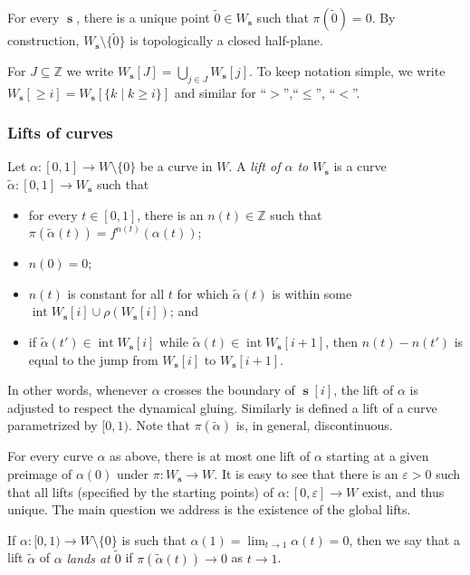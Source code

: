 \documentclass[]{amsart}
\newcommand\intr{\operatorname{int}}
\newcommand\seq{{\operatorname{\mathbf s}}}
\newcommand{\Z}{\mathbb{Z}}
\theoremstyle{remark}
\numberwithin{equation}{section}
\theoremstyle{definition}
\begin{document}
For every $\seq$, there is a unique point $\widetilde 0\in W_\seq$ such that $\pi(\widetilde 0)=0$. By construction, $W_\seq\setminus \{\widetilde 0\}$ is topologically a closed half-plane.
 
For $J\subseteq \Z$ we write $\displaystyle W_\seq[J]= \bigcup _{j\in J} W_\seq[j]$. To keep notation simple, we write $W_\seq[\ge i] =W_\seq[\{k\mid k\ge i\}]$ and similar for ``$>$'',``$\le$'', ``$<$''.




\subsubsection{Lifts of curves}
\label{sss:lifts of curves}
Let $\alpha\colon [0,1]\to W\setminus \{0\}$ be a curve in $W$. A \emph{lift of $\alpha$ to $W_{\seq}$} is a curve $\widetilde \alpha\colon [0,1]\to W_{\seq}$ such that
\begin{itemize}
\item for every $t\in[0,1]$, there is an $n(t)\in \Z$ such that $\pi(\widetilde \alpha(t))=f^ {n(t)}(\alpha(t))$;
\item $n(0)=0$;  
\item $n(t)$ is constant for all $t$ for which $\widetilde \alpha(t)$ is within some $\intr W_{\seq}[i] \cup \rho(W_\seq[i])$; and 
\item if $\widetilde \alpha(t')\in \intr W_{\seq}[i]$ while $\widetilde\alpha(t)\in \intr W_{\seq}[i+1]$, then $n(t)-n(t')$ is equal to the jump from $W_{\seq}[i]$ to $W_{\seq}[i+1]$.
\end{itemize}
In other words, whenever $\alpha$ crosses the boundary of $\seq[i]$, the lift of $\alpha$ is adjusted to respect the dynamical gluing. Similarly is defined a lift of a curve parametrized by $[0,1)$. Note that $\pi(\widetilde \alpha)$ is, in general, discontinuous.

For every curve $\alpha$ as above, there is at most one lift  of $\alpha$ starting at a given preimage of $\alpha(0)$ under $\pi\colon W_\seq\to W$. It is easy to see that there is an $\varepsilon>0$ such that all lifts (specified by the starting points) of $\alpha\colon [0,\varepsilon]\to W$ exist, and thus unique. The main question we address is the existence of the global lifts.

If $\alpha\colon [0,1)\to W\setminus \{0\}$ is such that $\alpha(1)=\lim _{t\to 1}\alpha (t)=0$, then we say that a lift $\widetilde \alpha$ of $\alpha$ \emph{lands at $\widetilde 0$} if $\pi(\widetilde \alpha (t))\to 0$ as $t\to 1$.
\end{document}
